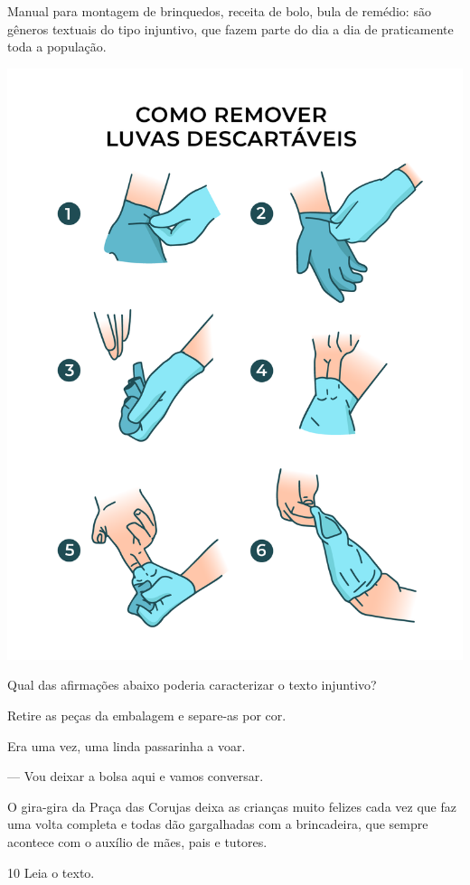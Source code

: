 \begin{myquote}
Manual para montagem de brinquedos, receita de bolo, bula de remédio:
são gêneros textuais do tipo injuntivo, que fazem parte do dia a dia de
praticamente toda a população.

\begin{center}
\includegraphics[width=.7\textwidth]{./media/image23m.png}
\end{center}

\end{myquote}

Qual das afirmações abaixo poderia caracterizar o texto injuntivo?

\begin{escolha}
\item Retire as peças da embalagem e separe-as por cor.

\item Era uma vez, uma linda passarinha a voar.

\item --- Vou deixar a bolsa aqui e vamos conversar.

\item O gira-gira da Praça das Corujas deixa as crianças muito felizes cada vez que faz uma volta completa e todas dão gargalhadas com a brincadeira, que sempre acontece com o auxílio de mães, pais e tutores. 
\end{escolha}


\num{10} Leia o texto.

